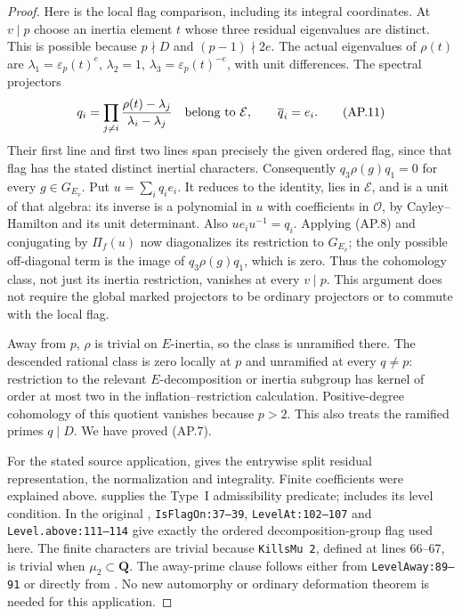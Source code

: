 \documentclass[11pt,a4paper]{article}
\theoremstyle{definition}
\begin{document}
\begin{proof}
Here is the local flag comparison, including its integral
coordinates.  At $v\mid p$ choose an inertia element $t$
whose three residual eigenvalues are distinct.  This is
possible because $p\nmid D$ and $(p-1)\nmid2e$.
The actual eigenvalues of $\rho(t)$ are
$\lambda_1=\varepsilon_p(t)^e$, $\lambda_2=1$,
$\lambda_3=\varepsilon_p(t)^{-e}$, with unit differences.
The spectral projectors
\[
 q_i=\prod_{j\ne i}
       \frac{\rho(t)-\lambda_j}{\lambda_i-\lambda_j}
       \quad\hbox{belong to }\mathcal E,
 \qquad\overline q_i=e_i.                                  \tag{AP.11}
\]
Their first line and first two lines span precisely the
given ordered flag, since that flag has the stated distinct
inertial characters.  Consequently
$q_3\rho(g)q_1=0$ for every $g\in G_{E_v}$.
Put $u=\sum_iq_ie_i$.  It reduces to the identity, lies in
$\mathcal E$, and is a unit of that algebra: its inverse
is a polynomial in $u$ with coefficients in $\mathcal O$,
by Cayley--Hamilton and its unit determinant.
Also $ue_iu^{-1}=q_i$.  Applying (AP.8) and conjugating by
$\Pi_f(u)$ now diagonalizes its restriction to $G_{E_v}$;
the only possible off-diagonal term is the image of
$q_3\rho(g)q_1$, which is zero.  Thus the cohomology class,
not just its inertia restriction, vanishes at every $v\mid p$.
This argument does not require the global marked projectors
to be ordinary projectors or to commute with the local flag.

Away from $p$, $\rho$ is trivial on $E$-inertia, so
the class is unramified there.  The descended rational
class is zero locally at $p$ and unramified at every
$q\ne p$: restriction to the relevant $E$-decomposition
or inertia subgroup has kernel of order at most two in
the inflation--restriction calculation.  Positive-degree
cohomology of this quotient vanishes because $p>2$.
This also treats the ramified primes $q\mid D$.
We have proved (AP.7).

For the stated source application, 
gives the entrywise split residual representation, the
normalization and integrality.  Finite coefficients were
explained above.   supplies
the Type~I admissibility predicate; 
includes its level condition.  In the original
,
\texttt{IsFlagOn:37--39}, \texttt{LevelAt:102--107} and
\texttt{Level.above:111--114} give exactly the ordered
decomposition-group flag used here.  The finite characters
are trivial because \texttt{KillsMu 2}, defined at lines
66--67, is trivial when $\mu_2\subset\mathbf Q$.
The away-prime clause follows either from
\texttt{LevelAway:89--91} or directly from
.  No new automorphy or
ordinary deformation theorem is needed for this application.
\end{proof}
\end{document}
